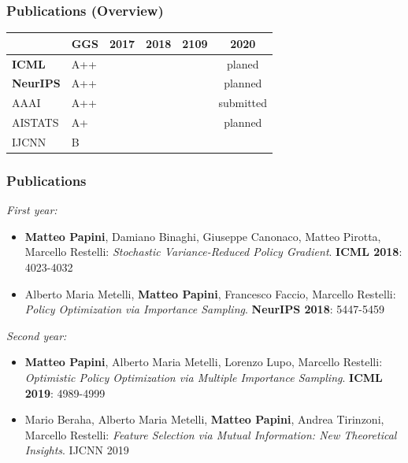 \documentclass[aspectratio=169]{beamer}
\begin{document}
\begin{frame}
\frametitle{Publications (Overview)}
\footnotesize 
\begin{table}
	\begin{tabular}{llcccc}
		& GGS & \textcolor{black!40}{2017} & 2018 & 2109 & 2020 \\
		\toprule
		\textbf{ICML} & A++ & & \citep{papini2018stochastic} & \citep{papini2019optimistic} & planed \\
		\textbf{NeurIPS} & A++ & \textcolor{black!40}{\citep{papini2017adaptive}} & \citep{metelli2018policy} & & planned \\
		\midrule
		AAAI &  A++ & & & & submitted \\
		AISTATS & A+ & & & & planned \\
		IJCNN & B & &  &\citep{beraha2019feature} & \\
		\bottomrule
	\end{tabular}
\end{table}

\end{frame}

\begin{frame}
\frametitle{Publications}
\emph{First year:}
\begin{itemize}
	\small
	\setlength{\itemsep}{10pt}
	\item  \textbf{Matteo Papini}, Damiano Binaghi, Giuseppe Canonaco, Matteo Pirotta, Marcello Restelli:
	\emph{Stochastic Variance-Reduced Policy Gradient}. \textbf{ICML 2018}: 4023-4032
	\item  Alberto Maria Metelli, \textbf{Matteo Papini}, Francesco Faccio, Marcello Restelli:
	\emph{Policy Optimization via Importance Sampling}. \textbf{NeurIPS 2018}: 5447-5459
\end{itemize}

\vfill

\emph{Second year:}
\begin{itemize}
	\small
	\setlength{\itemsep}{10pt}
	\item \textbf{Matteo Papini}, Alberto Maria Metelli, Lorenzo Lupo, Marcello Restelli:
	\emph{Optimistic Policy Optimization via Multiple Importance Sampling}. \textbf{ICML 2019}: 4989-4999
	\item Mario Beraha, Alberto Maria Metelli, \textbf{Matteo Papini}, Andrea Tirinzoni, Marcello Restelli:
	\emph{Feature Selection via Mutual Information: New Theoretical Insights}. IJCNN 2019
\end{itemize}
\end{frame}
\end{document}
